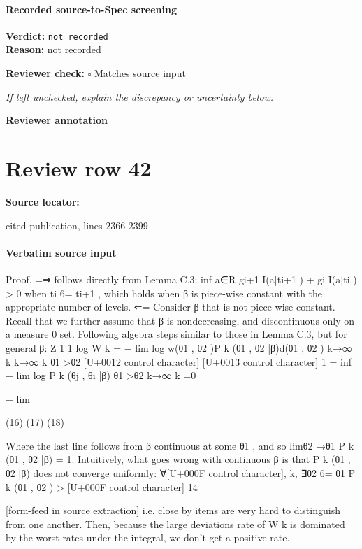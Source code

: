 \documentclass[10pt]{article}
\newcommand{\reviewerbox}{%
  \par\noindent\fbox{\parbox{0.96\linewidth}{\rule{0pt}{0.38in}}}\par
}
\newcommand{\reviewmatch}[1]{%
  \par\noindent\textbf{Reviewer check:} $\square$\; #1\par
  \noindent\emph{If left unchecked, explain the discrepancy or uncertainty below.}\par
}
\begin{document}
\paragraph{Recorded source-to-Spec screening}
\textbf{Verdict:} \texttt{not recorded}
\\
\textbf{Reason:} not recorded
\reviewmatch{Matches source input}
\noindent\textbf{Reviewer annotation}\par
\reviewerbox
\clearpage
\hypertarget{source-claim-043c064a62132f60}{}
\section*{Review row 42}
\textbf{Source locator:} {\footnotesize\raggedright cited publication, lines 2366-\allowbreak{}2399\par}
\paragraph{Verbatim source input}
\begin{ReviewVerbatim}
Proof. =⇒ follows directly from Lemma C.3: inf a∈R {gi+1 I(a|ti+1 ) + gi I(a|ti )} > 0 when ti 6= ti+1 ,
which holds when β is piece-wise constant with the appropriate number of levels.
⇐= Consider β that is not piece-wise constant. Recall that we further assume that β is nondecreasing, and discontinuous only on a measure 0 set. Following algebra steps similar to those in
Lemma C.3, but for general β:
Z
1
1
log W k = − lim log
w(θ1 , θ2 )P k (θ1 , θ2 |β)d(θ1 , θ2 )
k→∞ k
k→∞ k
θ1 >θ2
[U+0012 control character]
[U+0013 control character]
1
= inf − lim log P k (θj , θi |β)
θ1 >θ2
k→∞ k
=0

− lim

(16)
(17)
(18)

Where the last line follows from β continuous at some θ1 , and so limθ2 →θ1 P k (θ1 , θ2 |β) = 1.
Intuitively, what goes wrong with continuous β is that P k (θ1 , θ2 |β) does not converge uniformly:
∀[U+000F control character], k, ∃θ2 6= θ1 P k (θ1 , θ2 ) > [U+000F control character]
14


[form-feed in source extraction]
i.e. close by items are very hard to distinguish from one another. Then, because the large deviations
rate of W k is dominated by the worst rates under the integral, we don’t get a positive rate.
\end{ReviewVerbatim}
\end{document}
